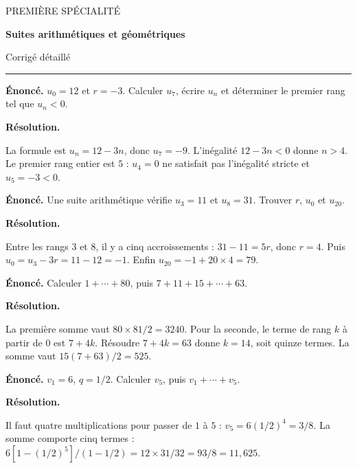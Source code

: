 \documentclass[11pt,a4paper]{article}
\begin{document}
{\small\color{Blue}PREMIÈRE SPÉCIALITÉ}\par{\LARGE\bfseries Suites arithmétiques et géométriques}\par{\large Corrigé détaillé}\par\vspace{0.2cm}\hrule\vspace{0.4cm}
\par\noindent\begin{minipage}{\linewidth}
{\small\color{Muted}\textbf{Énoncé.} $u_0=12$ et $r=-3$. Calculer $u_7$, écrire $u_n$ et déterminer le premier rang tel que $u_n<0$.}
\par\medskip
\textbf{Résolution.}\par
La formule est $u_n=12-3n$, donc $u_7=-9$. L’inégalité $12-3n<0$ donne $n>4$. Le premier rang entier est $5$ : $u_4=0$ ne satisfait pas l’inégalité stricte et $u_5=-3<0$.
\end{minipage}\par
\par\noindent\begin{minipage}{\linewidth}
{\small\color{Muted}\textbf{Énoncé.} Une suite arithmétique vérifie $u_3=11$ et $u_8=31$. Trouver $r$, $u_0$ et $u_{20}$.}
\par\medskip
\textbf{Résolution.}\par
Entre les rangs $3$ et $8$, il y a cinq accroissements : $31-11=5r$, donc $r=4$. Puis $u_0=u_3-3r=11-12=-1$. Enfin $u_{20}=-1+20\times4=79$.
\end{minipage}\par
\par\noindent\begin{minipage}{\linewidth}
{\small\color{Muted}\textbf{Énoncé.} Calculer $1+\cdots+80$, puis $7+11+15+\cdots+63$.}
\par\medskip
\textbf{Résolution.}\par
La première somme vaut $80\times81/2=3240$. Pour la seconde, le terme de rang $k$ à partir de $0$ est $7+4k$. Résoudre $7+4k=63$ donne $k=14$, soit quinze termes. La somme vaut $15(7+63)/2=525$.
\end{minipage}\par
\par\noindent\begin{minipage}{\linewidth}
{\small\color{Muted}\textbf{Énoncé.} $v_1=6$, $q=1/2$. Calculer $v_5$, puis $v_1+\cdots+v_5$.}
\par\medskip
\textbf{Résolution.}\par
Il faut quatre multiplications pour passer de $1$ à $5$ : $v_5=6(1/2)^4=3/8$. La somme comporte cinq termes : $6[1-(1/2)^5]/(1-1/2)=12\times31/32=93/8=11,625$.
\end{minipage}\par
\end{document}
